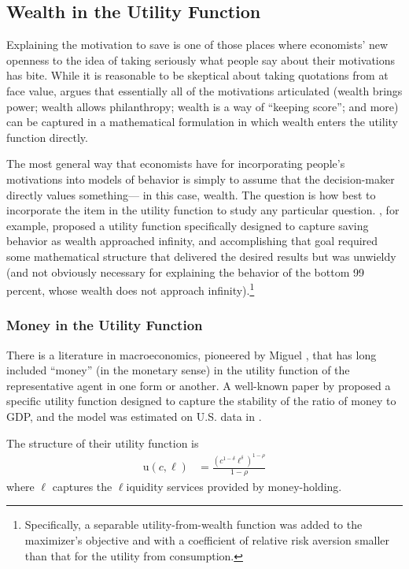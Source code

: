\documentclass[12pt,letterpaper, fleqn]{article}
\newcommand{\CRRA}{\rho}
\newcommand{\uFunc}{\mathrm{u}}
\newcommand{\cNrm}{c}
\newcommand{\lqdt}{\ell}
\begin{document}
\subsection{Wealth in the Utility Function}

Explaining the motivation to save is one of those places where economists' new openness to the idea of taking seriously what people say about their motivations has bite.
While it is reasonable to be skeptical about taking quotations from \cite{jaherGilded} at face value, \cite{WhyDoTheRich} argues that essentially all of the motivations articulated (wealth brings power; wealth allows philanthropy; wealth is a way of ``keeping score''; and more) can be captured in a mathematical formulation in which wealth enters the utility function directly.

The most general way that economists have for incorporating people's motivations into models of behavior is simply to assume that the decision-maker directly values something--- in this case, wealth.
The question is how best to incorporate the item in the utility function to study any particular question.
\cite{WhyDoTheRich}, for example, proposed a utility function specifically designed to capture saving behavior as wealth approached infinity, and accomplishing that goal required some mathematical structure that delivered the desired results but was unwieldy (and not obviously necessary for explaining the behavior of the bottom 99 percent, whose wealth does not approach infinity).\footnote{Specifically, a separable utility-from-wealth function was added to the maximizer's objective and with a coefficient of relative risk aversion smaller than that for the utility from consumption.}

\subsubsection{Money in the Utility Function}

There is a literature in macroeconomics, pioneered by Miguel \cite{sidrauski1967rational}, that has long included ``money'' (in the monetary sense) in the utility function of the representative agent in one form or another.
A well-known paper by \cite{Rotemberg1984} proposed a specific utility function designed to capture the stability of the ratio of money to GDP, and the model was estimated on U.S. data in \cite{Poterba_1986}.

The structure of their utility function is
\begin{align}
    \uFunc(\cNrm,\lqdt) & = \frac{\left(
        \cNrm^{1-\delta}\lqdt^{\delta}
        \right)^{1-\CRRA}}{1-\CRRA}
\end{align}
where $\lqdt$ captures the $\lqdt$iquidity services provided by money-holding.
\end{document}
